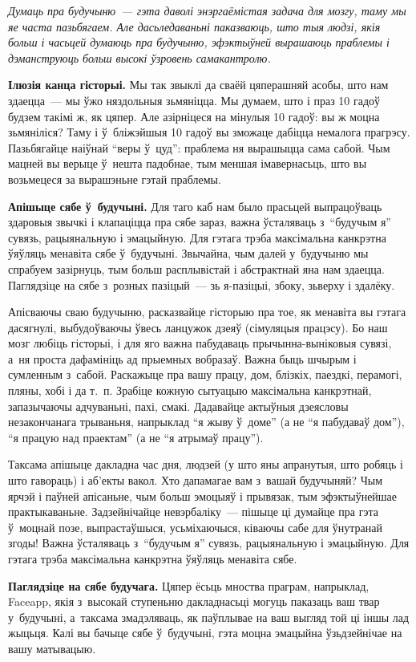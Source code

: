 \emph{Думаць пра будучыню~--- гэта даволі энэргаёмістая задача для мозгу, таму мы яе часта пазьбягаем. Але дасьледаваньні паказваюць, што тыя людзі, якія больш і часьцей думаюць пра будучыню, эфэктыўней вырашаюць праблемы і дэманструюць больш высокі ўзровень самакантролю.}

\textbf{Ілюзія канца гісторыі.} Мы так звыклі да сваёй цяперашняй асобы, што нам здаецца~--- мы ўжо няздольныя зьмяніцца. Мы думаем, што і праз 10 гадоў будзем такімі ж, як цяпер. Але азірніцеся на мінулыя 10 гадоў: вы ж моцна зьмяніліся? Таму і ў~бліжэйшыя 10 гадоў вы зможаце дабіцца немалога прагрэсу. Пазьбягайце наіўнай ``веры ў~цуд'': праблема ня вырашыцца сама сабой. Чым мацней вы верыце ў~нешта падобнае, тым меншая імавернасьць, што вы возьмецеся за вырашэньне гэтай праблемы.

\textbf{Апішыце сябе ў~будучыні.} Для таго каб нам было прасьцей выпрацоўваць здаровыя звычкі і клапаціцца пра сябе зараз, важна ўсталяваць з~``будучым я'' сувязь, рацыянальную і эмацыйную. Для гэтага трэба максімальна канкрэтна ўяўляць менавіта сябе ў~будучыні. Звычайна, чым далей у~будучыню мы спрабуем зазірнуць, тым больш расплывістай і абстрактнай яна нам здаецца. Паглядзіце на сябе з~розных пазіцый~--- зь я-пазіцыі, збоку, зьверху і здалёку.

Апісваючы сваю будучыню, расказвайце гісторыю пра тое, як менавіта вы гэтага дасягнулі, выбудоўваючы ўвесь ланцужок дзеяў (сімуляцыя працэсу). Бо наш мозг любіць гісторыі, і для яго важна пабудаваць прычынна-выніковыя сувязі, а~ня проста дафамініць ад прыемных вобразаў. Важна быць шчырым і сумленным з~сабой. Раскажыце пра вашу працу, дом, блізкіх, паездкі, перамогі, пляны, хобі і да т.~п. Зрабіце кожную сытуацыю максімальна канкрэтнай, запазычаючы адчуваньні, пахі, смакі. Дадавайце актыўныя дзеясловы незакончанага трываньня, напрыклад ``я жыву ў~доме'' (а не ``я пабудаваў дом''), ``я працую над праектам'' (а не ``я атрымаў працу'').

Таксама апішыце дакладна час дня, людзей (у што яны апранутыя, што робяць і што гавораць) і аб'екты вакол. Хто дапамагае вам з~вашай будучыняй? Чым ярчэй і паўней апісаньне, чым больш эмоцыяў і прывязак, тым эфэктыўнейшае практыкаваньне. Задзейнічайце невэрбаліку~--- пішыце ці думайце пра гэта ў~моцнай позе, выпрастаўшыся, усьміхаючыся, ківаючы сабе для ўнутранай згоды! Важна ўсталяваць з~``будучым я'' сувязь, рацыянальную і эмацыйную. Для гэтага трэба максімальна канкрэтна ўяўляць менавіта сябе.

\textbf{Паглядзіце на сябе будучага.} Цяпер ёсьць мноства праграм, напрыклад, Faceapp, якія з~высокай ступеньню дакладнасьці могуць паказаць ваш твар у~будучыні, а~таксама змадэляваць, як паўплывае на ваш выгляд той ці іншы лад жыцьця. Калі вы бачыце сябе ў~будучыні, гэта моцна эмацыйна ўзьдзейнічае на вашу матывацыю.

